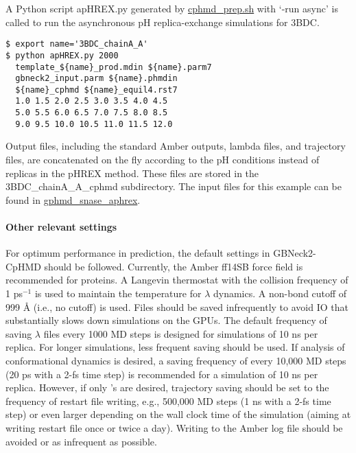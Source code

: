 A Python script apHREX.py generated by 
\href{https://gitlab.com/shenlab-amber-cphmd/cphmd-prep/-/tree/master/cphmd_tools/cphmd_prep.sh}{cphmd\_prep.sh}
with `-run async' 
is called to run the asynchronous pH replica-exchange simulations for 3BDC. 
\begin{lstlisting}
$ export name='3BDC_chainA_A'
$ python apHREX.py 2000
  template_${name}_prod.mdin ${name}.parm7
  gbneck2_input.parm ${name}.phmdin
  ${name}_cphmd ${name}_equil4.rst7
  1.0 1.5 2.0 2.5 3.0 3.5 4.0 4.5
  5.0 5.5 6.0 6.5 7.0 7.5 8.0 8.5
  9.0 9.5 10.0 10.5 11.0 11.5 12.0
\end{lstlisting}
Output files, including the standard Amber outputs, lambda files, and trajectory files, are concatenated on the fly according to the pH conditions instead of replicas in the pHREX method. 
These files are stored in the 3BDC\_chainA\_A\_cphmd subdirectory.
The input files for this example can be found in \href{https://gitlab.com/shenlab-amber-cphmd/cphmd-tutorial/-/tree/main/gphmd_Amber/gphmd_snase_aphrex}{gphmd\_snase\_aphrex}.

\paragraph{Other relevant settings}
For optimum performance in {\pka} prediction,
the default settings in GBNeck2-CpHMD should be followed.
Currently, the Amber ff14SB force field
is recommended for proteins.
A Langevin thermostat with the collision frequency of 1 ps$^{-1}$ is used to maintain the temperature for $\lambda$ dynamics. 
A non-bond cutoff of 999 {\AA} (i.e., no cutoff) is used. 
Files should be saved infrequently to avoid IO that substantially slows down simulations on the GPUs.
The default frequency of saving $\lambda$ files
every 1000 MD steps
is designed for simulations of 10 ns per replica. For longer simulations, less frequent saving should be used.
If analysis of conformational dynamics is desired, a saving frequency of every 10,000 MD steps (20 ps with a 2-fs time step) is recommended
for a simulation of 10 ns per replica. 
However, if only {\pka's} are desired, trajectory saving should be set to the frequency of restart file writing, e.g., 500,000 MD steps (1 ns with a 2-fs time step) or even larger depending on the wall clock time of the simulation (aiming at writing restart file once or twice a day). Writing to the Amber log file should be avoided or as infrequent as possible. 